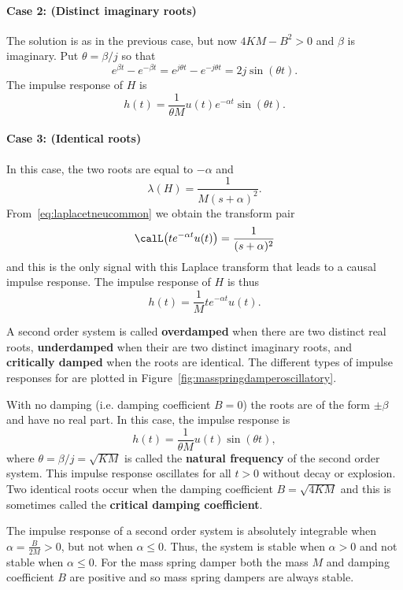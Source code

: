 \documentclass[11pt,a4paper]{book}
\theoremstyle{plain}
\numberwithin{equation}{section}
\newcommand{\term}{\textbf}
\begin{document}
\paragraph{Case 2: (Distinct imaginary roots)}
The solution is as in the previous case, but now $4KM - B^2 > 0$ and $\beta$ is imaginary.  Put $\theta = \beta/j$ so that
\[
e^{\beta t} - e^{-\beta t} = e^{j \theta t} - e^{-j \theta t} = 2 j \sin(\theta t).
\]
The impulse response of $H$ is
\[
h(t) = \frac{1}{ \theta M} u(t) e^{-\alpha t} \sin(\theta t).
\]

\paragraph{Case 3: (Identical roots)}
In this case, the two roots are equal to $-\alpha$ and
\[
\lambda(H) = \frac{1}{M(s + \alpha)^2}.
\]
From~\eqref{eq:laplacetneucommon} we obtain the transform pair
\[
\calL\big(t e^{-\alpha t} u(t)\big) = \frac{1}{(s + \alpha)^2}
\]
and this is the only signal with this Laplace transform that leads to a causal impulse response.  The impulse response of $H$ is thus
\[
h(t) = \frac{1}{M} t e^{-\alpha t} u(t).
\]

A second order system is called \term{overdamped} when there are two distinct real roots, \term{underdamped} when their are two distinct imaginary roots, and \term{critically damped} when the roots are identical.  The different types of impulse responses for are plotted in Figure~\ref{fig:masspringdamperoscillatory}.

With no damping (i.e. damping coefficient $B = 0$) the roots are of the form $\pm \beta$ and have no real part.  In this case, the impulse response is
\[
h(t) = \frac{1}{ \theta M} u(t) \sin(\theta t),
\]
where $\theta = \beta/j = \sqrt{KM}$ is called the \term{natural frequency} of the second order system.  This impulse response oscillates for all $t > 0$ without decay or explosion.  Two identical roots occur when the damping coefficient $B = \sqrt{4KM}$ and this is sometimes called the \term{critical damping coefficient}.

The impulse response of a second order system is absolutely integrable when $\alpha =  \tfrac{B}{2M} > 0$, but not when $\alpha \leq 0$.  Thus, the system is stable when $\alpha > 0$ and not stable when $\alpha \leq 0$.   For the mass spring damper both the mass $M$ and damping coefficient $B$ are positive and so mass spring dampers are always stable.
\end{document}
